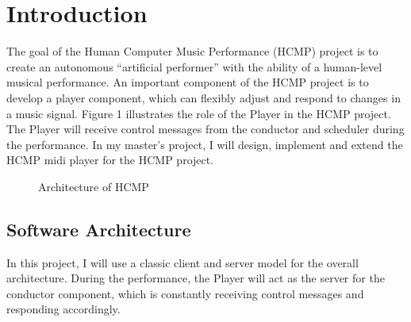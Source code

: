 \documentclass[12pt]{article} %
\begin{document}
\tableofcontents %
\setcounter{page}{2}

\newpage %


\pagestyle{headings}
\setcounter{page}{1}

\section{Introduction} %

The goal of the Human Computer Music Performance (HCMP) \cite{Dawen:2011} project is to create an autonomous 
``artificial performer'' with the ability of a human-level musical performance. 
An important component of the HCMP project is to develop a player component, which can flexibly  
adjust and respond to changes in a music signal. Figure 1 illustrates the role of the Player in the HCMP
project. The Player will receive control messages from the conductor and scheduler during the performance. 
In my master's project, I will design, implement and extend the HCMP midi player for the HCMP project. 

\begin{figure}[H] %
\caption{Architecture of HCMP}
\label{fig:speciation}
\end{figure}

\subsection{Software Architecture} %
In this project, I will use a classic client and server model for the overall architecture. 
During the performance, the Player will act as the server for the conductor component, which is constantly 
receiving control messages and responding accordingly. 
\end{document}
